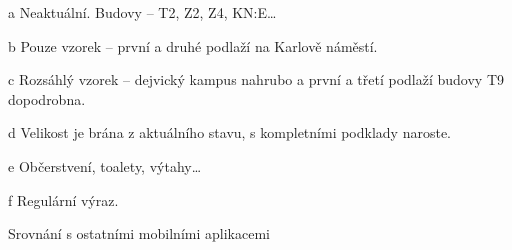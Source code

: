 \begin{table}
\begin{center}
\begin{threeparttable}
\begin{tablenotes}
 \item[a] Neaktuální. Budovy   -- T2, Z2, Z4, KN:E\dots
 \item[b] Pouze vzorek -- první a druhé podlaží na Karlově náměstí.
 \item[c] Rozsáhlý vzorek -- dejvický kampus nahrubo a první a třetí podlaží budovy T9 dopodrobna.
 \item[d] Velikost je brána z aktuálního stavu, s kompletními podklady naroste.
 \item[e] Občerstvení, toalety, výtahy\dots
 \item[f] Regulární výraz.
\end{tablenotes}
\caption{Srovnání s ostatními mobilními aplikacemi}
\label{tab:srovnaniReseni}
\end{threeparttable}
\end{center}
\end{table}
